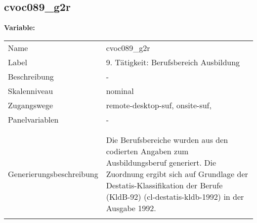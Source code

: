 	
	
	\subsection{cvoc089\_g2r}
	\label{subSection:cvoc089_g2r}

	\noindent\textbf{Variable:}\\
		\begin{tabular}{lL{11.3cm}}
			\label{tableVariable:cvoc089_g2r}
			Name & cvoc089\_g2r \\
			Label & 9. Tätigkeit: Berufsbereich Ausbildung \\
			Beschreibung & - \\
			Skalenniveau & nominal \\
			Zugangswege &
				remote-desktop-suf,
				onsite-suf,
 \\
			Panelvariablen & -
			 \\
			 \\
 \\
					Generierungsbeschreibung & Die Berufsbereiche wurden aus den codierten Angaben zum Ausbildungsberuf generiert. Die Zuordnung ergibt sich auf Grundlage der Destatis-Klassifikation der Berufe (KldB-92) (cl-destatis-kldb-1992) in der Ausgabe 1992. 
				 \\	
			 \\
		\end{tabular}






